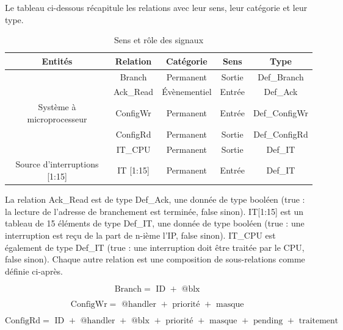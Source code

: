 Le tableau ci-dessous récapitule les relations avec leur sens, leur catégorie et leur type.

\begin{table}[H]
	\centering
	\begin{tabular}{|c|c|c|c|c|}
		\hline
		Entités                       & Relation  & Catégorie    & Sens   & Type          \\
		\hline
		                              & Branch    & Permanent    & Sortie & Def\_Branch   \\
		                              & Ack\_Read & Évènementiel & Entrée & Def\_Ack      \\
		Système à microprocesseur     & ConfigWr  & Permanent    & Entrée & Def\_ConfigWr \\
		                              & ConfigRd  & Permanent    & Sortie & Def\_ConfigRd \\
		                              & IT\_CPU   & Permanent    & Sortie & Def\_IT       \\
		\hline
		Source d'interruptions [1:15] & IT [1:15] & Permanent    & Entrée & Def\_IT       \\
		\hline
	\end{tabular}
	\caption{Sens et rôle des signaux}
	\label{tab:entrees_sorties_composant}
\end{table}

La relation Ack\_Read est de type Def\_Ack, une donnée de type booléen (true : la lecture de l'adresse de branchement est terminée, false sinon).
IT[1:15] est un tableau de 15 éléments de type Def\_IT, une donnée de type booléen (true : une interruption est reçu de la part de n-ième l'IP, false sinon).
IT\_CPU est également de type Def\_IT (true : une interruption doit être traitée par le CPU, false sinon).
Chaque autre relation est une composition de sous-relations comme définie ci-après.

\begin{equation*}
\mbox{Branch} = \mbox{ ID } + \mbox{ @blx }
\end{equation*}

\begin{equation*}
\mbox{ConfigWr} = \mbox{ @handler } + \mbox{ priorité } + \mbox{ masque }
\end{equation*}

\begin{equation*}
\mbox{ConfigRd} = \mbox{ ID } + \mbox{ @handler } + \mbox{ @blx } + \mbox{ priorité } + \mbox{ masque } + \mbox{ pending } + \mbox{ traitement }
\end{equation*}

